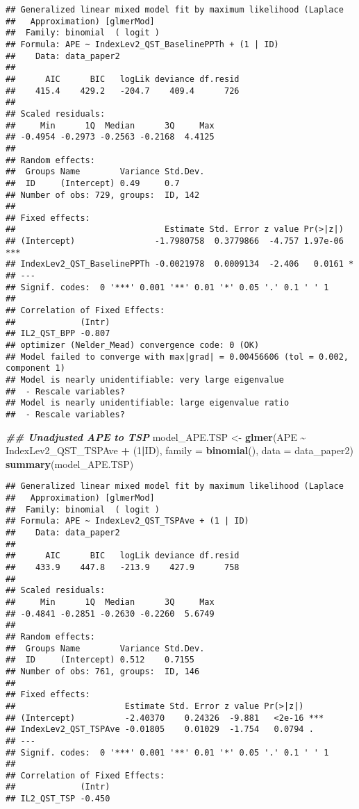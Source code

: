 \documentclass[
  12pt,
]{article}
\newenvironment{Shaded}{\begin{snugshade}}{\end{snugshade}}
\newcommand{\AttributeTok}[1]{\textcolor[rgb]{0.13,0.29,0.53}{#1}}
\newcommand{\DecValTok}[1]{\textcolor[rgb]{0.00,0.00,0.81}{#1}}
\newcommand{\DocumentationTok}[1]{\textcolor[rgb]{0.56,0.35,0.01}{\textbf{\textit{#1}}}}
\newcommand{\FunctionTok}[1]{\textcolor[rgb]{0.13,0.29,0.53}{\textbf{#1}}}
\newcommand{\NormalTok}[1]{#1}
\newcommand{\OtherTok}[1]{\textcolor[rgb]{0.56,0.35,0.01}{#1}}
\newcommand{\SpecialCharTok}[1]{\textcolor[rgb]{0.81,0.36,0.00}{\textbf{#1}}}
\begin{document}
\begin{verbatim}
## Generalized linear mixed model fit by maximum likelihood (Laplace
##   Approximation) [glmerMod]
##  Family: binomial  ( logit )
## Formula: APE ~ IndexLev2_QST_BaselinePPTh + (1 | ID)
##    Data: data_paper2
## 
##      AIC      BIC   logLik deviance df.resid 
##    415.4    429.2   -204.7    409.4      726 
## 
## Scaled residuals: 
##     Min      1Q  Median      3Q     Max 
## -0.4954 -0.2973 -0.2563 -0.2168  4.4125 
## 
## Random effects:
##  Groups Name        Variance Std.Dev.
##  ID     (Intercept) 0.49     0.7     
## Number of obs: 729, groups:  ID, 142
## 
## Fixed effects:
##                              Estimate Std. Error z value Pr(>|z|)    
## (Intercept)                -1.7980758  0.3779866  -4.757 1.97e-06 ***
## IndexLev2_QST_BaselinePPTh -0.0021978  0.0009134  -2.406   0.0161 *  
## ---
## Signif. codes:  0 '***' 0.001 '**' 0.01 '*' 0.05 '.' 0.1 ' ' 1
## 
## Correlation of Fixed Effects:
##             (Intr)
## IL2_QST_BPP -0.807
## optimizer (Nelder_Mead) convergence code: 0 (OK)
## Model failed to converge with max|grad| = 0.00456606 (tol = 0.002, component 1)
## Model is nearly unidentifiable: very large eigenvalue
##  - Rescale variables?
## Model is nearly unidentifiable: large eigenvalue ratio
##  - Rescale variables?
\end{verbatim}

\begin{Shaded}
\begin{Highlighting}[]
\DocumentationTok{\#\# Unadjusted APE to TSP}
\NormalTok{model\_APE.TSP }\OtherTok{\textless{}{-}} \FunctionTok{glmer}\NormalTok{(APE }\SpecialCharTok{\textasciitilde{}}\NormalTok{ IndexLev2\_QST\_TSPAve }\SpecialCharTok{+}\NormalTok{ (}\DecValTok{1}\SpecialCharTok{|}\NormalTok{ID), }\AttributeTok{family =} \FunctionTok{binomial}\NormalTok{(), }\AttributeTok{data =}\NormalTok{ data\_paper2)}
\FunctionTok{summary}\NormalTok{(model\_APE.TSP)}
\end{Highlighting}
\end{Shaded}

\begin{verbatim}
## Generalized linear mixed model fit by maximum likelihood (Laplace
##   Approximation) [glmerMod]
##  Family: binomial  ( logit )
## Formula: APE ~ IndexLev2_QST_TSPAve + (1 | ID)
##    Data: data_paper2
## 
##      AIC      BIC   logLik deviance df.resid 
##    433.9    447.8   -213.9    427.9      758 
## 
## Scaled residuals: 
##     Min      1Q  Median      3Q     Max 
## -0.4841 -0.2851 -0.2630 -0.2260  5.6749 
## 
## Random effects:
##  Groups Name        Variance Std.Dev.
##  ID     (Intercept) 0.512    0.7155  
## Number of obs: 761, groups:  ID, 146
## 
## Fixed effects:
##                      Estimate Std. Error z value Pr(>|z|)    
## (Intercept)          -2.40370    0.24326  -9.881   <2e-16 ***
## IndexLev2_QST_TSPAve -0.01805    0.01029  -1.754   0.0794 .  
## ---
## Signif. codes:  0 '***' 0.001 '**' 0.01 '*' 0.05 '.' 0.1 ' ' 1
## 
## Correlation of Fixed Effects:
##             (Intr)
## IL2_QST_TSP -0.450
\end{verbatim}
\end{document}
